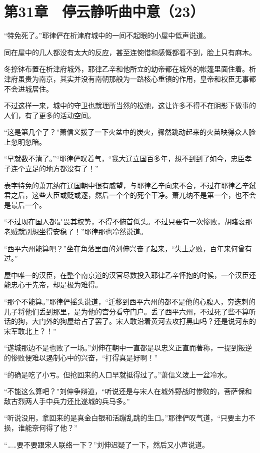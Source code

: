 \section{第31章　停云静听曲中意（23）}

“特免死了。”耶律俨在析津府城中的一间不起眼的小屋中低声说道。

同在屋中的几人都没有太大的反应，甚至连惋惜和感慨都看不到，脸上只有麻木。

冬捺钵布置在析津府城外，耶律乙辛和他所立的幼帝都在城外的帐篷里面住着。析津府虽贵为南京，其实并没有南朝那般为一路核心重镇的作用，皇帝和权臣无事都不会进城居住。

不过这样一来，城中的守卫也就理所当然的松弛，这让许多不得不在阴影下做事的人们，有了更多的活动空间。

“这是第几个了？”萧信义拨了一下火盆中的炭火，骤然跳动起来的火苗映得众人脸上忽明忽暗。

“早就数不清了。”“耶律俨叹着气，“我大辽立国百多年，想不到到了如今，忠臣孝子连个立足的地方都没有了！”

表字特免的萧兀纳在辽国朝中很有威望，与耶律乙辛向来不合，不过在耶律乙辛弑君之后，这些大臣或贬或逐，然后一个个的死个干净。萧兀纳不是第一个，也不会是最后一个。

“不过现在国人都是畏其权势，不得不俯首低头。不过只要有一次惨败，胡睹衮那老贼就别想坐得安稳了！”耶律那也冷然说道。

“西平六州能算吧？”坐在角落里面的刘伸兴奋了起来，“失土之败，百年来何曾有过。”

屋中唯一的汉臣，在整个南京道的汉官尽数投入耶律乙辛怀抱的时候，一个汉臣还能忠心于先帝，却是极为难得。

“那个不能算。”耶律俨摇头说道，“迁移到西平六州的都不是他的心腹人，穷迭刺的儿子将他们丢到那里，是为他的宫分看守门户。丢了西平六州，不过死了些不算听话的狗，大门外的狗屋给占了罢了。宋人敢沿着黄河去攻打黑山吗？还是说河东的宋军敢北上？！”

“遂城那边不是也败了一场。”刘伸在朝中一直都是以忠义正直而著称，一提到叛逆的惨败便难以遏制心中的兴奋，“打得真是好啊！”

“的确是吃了小亏。但抢回来的人口早就抵得过了。”萧信义泼上一盆冷水。

“不能这么算吧？”刘伸争辩道，“听说还是与宋人在城外野战时惨败的，菩萨保和敌古烈两人手中兵力还比遂城的兵马多。”

“听说没用，拿回来的是真金白银和活蹦乱跳的生口。”耶律俨叹气道，“只要主力不损，谁能奈何得了他？”

“……要不要跟宋人联络一下？”刘伸迟疑了一下，然后又小声说道。

